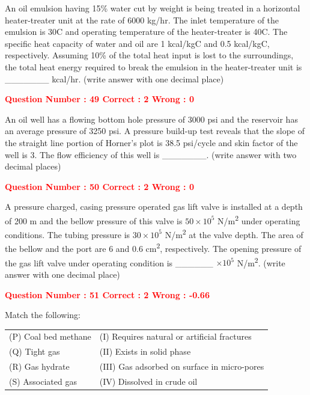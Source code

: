 \documentclass[12pt]{article}
\begin{document}
{An oil emulsion having 15\% water cut by weight is being treated in a horizontal heater-treater unit at the rate of 6000 kg/hr. The inlet temperature of the emulsion is 30\textdegree C and operating temperature of the heater-treater is 40\textdegree C. The specific heat capacity of water and oil are 1 kcal/kg\textdegree C and 0.5 kcal/kg\textdegree C, respectively. Assuming 10\% of the total heat input is lost to the surroundings, the total heat energy required to break the emulsion in the heater-treater unit is \_\_\_\_\_\_\_ kcal/hr. (write answer with one decimal place)

\vspace{1em}


\textcolor{red}{\textbf{Question Number : 49 \hfill Correct : 2  Wrong : 0}}

\vspace{0.5em}

An oil well has a flowing bottom hole pressure of 3000 psi and the reservoir has an average pressure of 3250 psi. A pressure build-up test reveals that the slope of the straight line portion of Horner’s plot is 38.5 psi/cycle and skin factor of the well is 3. The flow efficiency of this well is \_\_\_\_\_\_\_. (write answer with two decimal places)

\vspace{1em}


\textcolor{red}{\textbf{Question Number : 50 \hfill Correct : 2  Wrong : 0}}

\vspace{0.5em}

A pressure charged, casing pressure operated gas lift valve is installed at a depth of 200 m and the bellow pressure of this valve is $50 \times 10^5$ N/m\textsuperscript{2} under operating conditions. The tubing pressure is $30 \times 10^5$ N/m\textsuperscript{2} at the valve depth. The area of the bellow and the port are 6 and 0.6 cm\textsuperscript{2}, respectively. The opening pressure of the gas lift valve under operating condition is \_\_\_\_\_\_ $\times 10^5$ N/m\textsuperscript{2}. (write answer with one decimal place)

\vspace{1em}


\textcolor{red}{\textbf{Question Number : 51 \hfill Correct : 2  Wrong : -0.66}}

\vspace{0.5em}

Match the following:

\begin{tabular}{ll}
(P) Coal bed methane & (I) Requires natural or artificial fractures \\
(Q) Tight gas        & (II) Exists in solid phase \\
(R) Gas hydrate      & (III) Gas adsorbed on surface in micro-pores \\
(S) Associated gas   & (IV) Dissolved in crude oil \\
\end{tabular}

}
\end{document}
